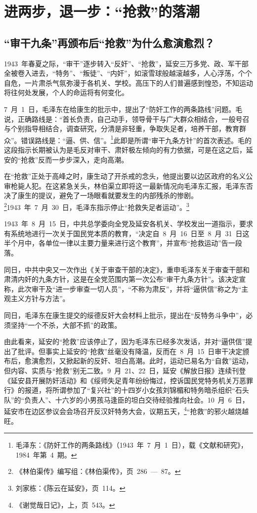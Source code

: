 
\chapter{进两步，退一步：“抢救”的落潮}

\section{“审干九条”再颁布后“抢救”为什么愈演愈烈？}

1943~年春夏之际，“审干”逐步转入“反奸”、“抢救”，延安三万多党、政、军干部全被卷入进去，“特务”、“叛徒”、“内奸”，如滚雪球般越滚越多，人心浮荡，个个自危，一片肃杀气氛弥漫于各机关、学校。高压下的人们普遍感到惶恐，不知运动将往何处发展，个人的命运将有何变化。

7~月~1~日，毛泽东在给康生的批示中，提出了“防奸工作的两条路线”问题。毛说，正确路线是：“首长负责，自己动手，领导骨干与广大群众相结合，一般号召与个别指导相结合，调查研究，分清是非轻重，争取失足者，培养干部，教育群众”。错误路线是：“逼、供、信”。\footnote{毛泽东：《防奸工作的两条路线》（1943~年~7~月~1~日），载《文献和研究》，1984~年第~4~期。}此即是所谓“审干九条方针”的首次表述。毛的这段指示长期被认为是毛反对审干、肃奸极左倾向的有力依据，可是在这之后，延安的“抢救”反而一步步深入，走向高潮。

在“抢救”正处于高峰之时，康生动了开杀戒的念头，他提出要以边区政府的名义公审枪毙人犯。在这紧急关头，林伯渠立即将这一最新情况向毛泽东汇报，毛泽东否决了康生的提议，避免了一场眼看就要发生的内部残杀的惨剧。\footnote{《林伯渠传》编写组：《林伯渠传》，页~286~—~87。}1943~年~7~月~30~日，毛泽东指示停止“抢救失足者运动”。\footnote{刘家栋：《陈云在延安》，页~114。}

1943~年~8~月~15~日，中共总学委向全党及延安各机关、学校发出一道指示，要求有系统地进行一次关于国民党本质的教育，“决定自~8~月~16~日至~8~月~31~日这半个月中，各单位一律以主要力量来进行这个教育”，并宣布“抢救运动”告一段落。

同日，中共中央又一次作出《关于审查干部的决定》，重申毛泽东关于审查干部和肃清内奸的九条方针，这是在全党范围内第一次公布“审干九条方针”。该决定宣称，此次审干及“进一步审查一切人员”，“不称为肃反”，并将“逼供信”称之为“主观主义方针与方法”。

同日，毛泽东在康生提交的绥德反奸大会材料上批示，提出在“反特务斗争中”，必须坚持“一个不杀，大部不抓”的政策。

由此看来，延安的“抢救”应该停止了，因为毛泽东已经多次发话，并对“逼供信”提出了批评。但事实上延安的“抢救”丝毫没有降温，反而在~8~月~15~日审干决定颁布后，愈演愈烈，又掀起新的反奸、坦白高潮。此时，运动已易名为“自救”运动，但内容、实质与“抢救”别无二致。9~月~21、22~日，延安《解放日报》连续刊登《延安县开展防奸活动》和《绥师失足青年纷纷悔过，控诉国民党特务机关万恶罪行》的报道，将所谓参加了“复兴社”的十四岁小女孩刘锦楣和特务暗杀组织“石头队”的“负责人”、十六岁的小男孩马逢臣的坦白交待经验推向社会。10~月~6~日，延安市在边区参议会会场召开反汉奸特务大会，议期五天，\footnote{《谢觉哉日记》，上，页~543。}“抢救”的邪火越烧越旺。

